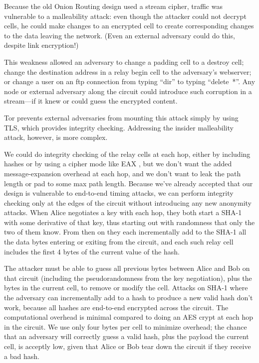 \documentclass[times,10pt,twocolumn]{article}
\begin{document}

Because the old Onion Routing design used a stream cipher, traffic was
vulnerable to a malleability attack: even though the attacker could not
decrypt cells, he could make changes to an encrypted
cell to create corresponding changes to the data leaving the network.
(Even an external adversary could do this, despite link encryption!)

This weakness allowed an adversary to change a padding cell to a destroy
cell; change the destination address in a relay begin cell to the
adversary's webserver; or change a user on an ftp connection from
typing ``dir'' to typing ``delete~*''. Any node or external adversary
along the circuit could introduce such corruption in a stream---if it
knew or could guess the encrypted content.

Tor prevents external adversaries from mounting this attack simply by
using TLS, which provides integrity checking.
Addressing the insider malleability attack, however, is
more complex.

We could do integrity checking of the relay cells at each hop, either
by including hashes or by using a cipher mode like EAX \cite{eax},
but we don't want the added message-expansion overhead at each hop, and
we don't want to leak the path length or pad to some max path length.
Because we've already accepted that our design is vulnerable to end-to-end
timing attacks, we can perform integrity checking only at the edges of
the circuit without introducing any new anonymity attacks. When Alice
negotiates a key
with each hop, they both start a SHA-1 with some derivative of that key,
thus starting out with randomness that only the two of them know. From
then on they each incrementally add to the SHA-1 all the data bytes
entering or exiting from the circuit, and each such relay cell includes
the first 4 bytes of the current value of the hash.

The attacker must be able to guess all previous bytes between Alice
and Bob on that circuit (including the pseudorandomness from the key
negotiation), plus the bytes in the current cell, to remove or modify the
cell. Attacks on SHA-1 where the adversary can incrementally add to a
hash to produce a new valid hash don't work,
because all hashes are end-to-end encrypted across the circuit.
The computational overhead is minimal compared to doing an AES
crypt at each hop in the circuit. We use only four bytes per cell to
minimize overhead; the chance that an adversary will correctly guess a
valid hash, plus the payload the current cell, is acceptly low, given
that Alice or Bob tear down the circuit if they receive a bad hash.
\end{document}
